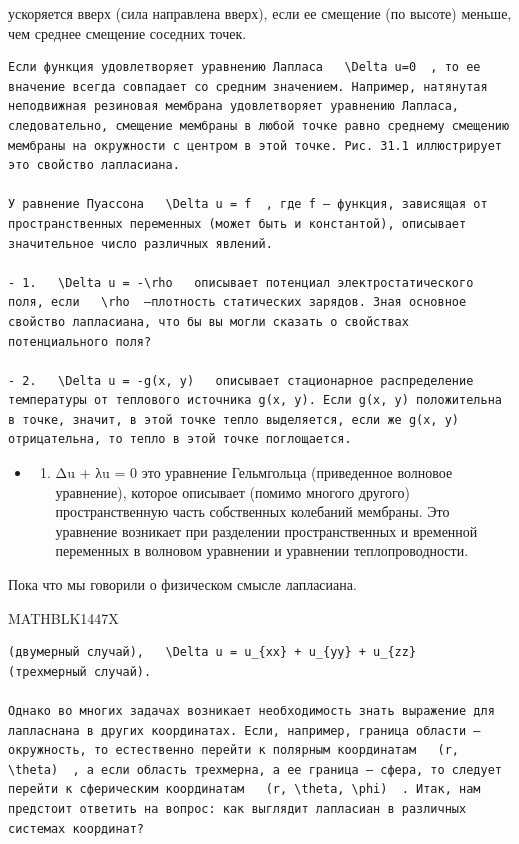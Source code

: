 \documentclass[
]{article}
\providecommand{\tightlist}{%
  \setlength{\itemsep}{0pt}\setlength{\parskip}{0pt}}
\begin{document}
ускоряется вверх (сила направлена вверх), если ее смещение (по высоте)
меньше, чем среднее смещение соседних точек.

\begin{verbatim}
Если функция удовлетворяет уравнению Лапласа   \Delta u=0  , то ее вначение всегда совпадает со средним значением. Например, натянутая неподвижная резиновая мембрана удовлетворяет уравнению Лапласа, следовательно, смещение мембраны в любой точке равно среднему смещению мембраны на окружности с центром в этой точке. Рис. 31.1 иллюстрирует это свойство лапласиана.

У равнение Пуассона   \Delta u = f  , где f — функция, зависящая от пространственных переменных (может быть и константой), описывает значительное число различных явлений.

- 1.   \Delta u = -\rho   описывает потенциал электростатического поля, если   \rho  —плотность статических зарядов. Зная основное свойство лапласиана, что бы вы могли сказать о свойствах потенциального поля?

- 2.   \Delta u = -g(x, y)   описывает стационарное распределение температуры от теплового источника g(x, y). Если g(x, y) положительна в точке, значит, в этой точке тепло выделяется, если же g(x, y) отрицательна, то тепло в этой точке поглощается.
\end{verbatim}

\begin{itemize}
\tightlist
\item
  \begin{enumerate}
  \def\labelenumi{\arabic{enumi}.}
  \setcounter{enumi}{2}
  \tightlist
  \item
    Δu + λu = 0 это уравнение Гельмгольца (приведенное волновое
    уравнение), которое описывает (помимо многого другого)
    пространственную часть собственных колебаний мембраны. Это уравнение
    возникает при разделении пространственных и временной переменных в
    волновом уравнении и уравнении теплопроводности.
  \end{enumerate}
\end{itemize}

Пока что мы говорили о физическом смысле лапласиана.

MATHBLK1447X

\begin{verbatim}
(двумерный случай),   \Delta u = u_{xx} + u_{yy} + u_{zz}   (трехмерный случай).

Однако во многих задачах возникает необходимость знать выражение для лапласнана в других координатах. Если, например, граница области — окружность, то естественно перейти к полярным координатам   (r, \theta)  , а если область трехмерна, а ее граница — сфера, то следует перейти к сферическим координатам   (r, \theta, \phi)  . Итак, нам предстоит ответить на вопрос: как выглядит лапласиан в различных системах координат?
\end{verbatim}
\end{document}
